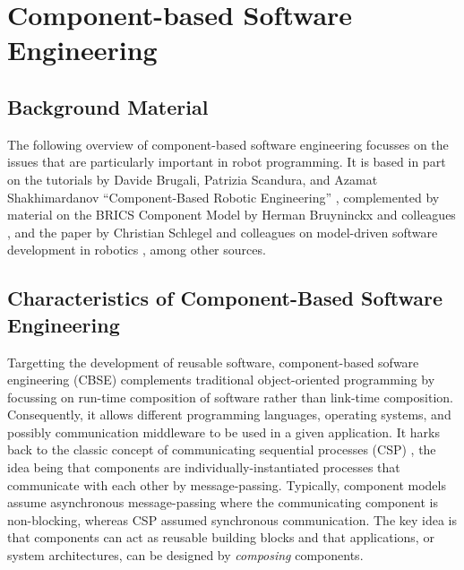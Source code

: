 \documentclass{CSSRforAfrica}
\begin{document}
\section{Component-based Software Engineering}
\label{section:componentSE}

\subsection{Background Material}

The following overview of component-based software engineering focusses on the issues that are particularly important in robot programming. It is based in part on the tutorials by Davide Brugali, Patrizia Scandura, and Azamat Shakhimardanov ``Component-Based Robotic Engineering'' \cite{BrugaliScandurra09,BrugaliShakhamirdanov10}, complemented by material on the BRICS Component Model by Herman Bruyninckx and colleagues \cite{Bruyninckxetal13}, and the paper by Christian Schlegel and colleagues on model-driven software development in robotics \cite{SchlegelSteckLotz2011}, among other sources.


\subsection{Characteristics of Component-Based Software Engineering}

Targetting the development of reusable software, component-based sofware engineering (CBSE)  complements traditional object-oriented programming by focussing on run-time composition of software rather than link-time composition.  Consequently, it allows different programming languages, operating systems, and possibly communication middleware to be used in a given application.  It harks back to the classic concept of communicating sequential processes (CSP) \cite{Hoare78}, the idea being that components are individually-instantiated processes that communicate  with each other by message-passing. Typically,  component models assume asynchronous message-passing where the communicating component is non-blocking, whereas CSP assumed synchronous communication.   The key idea is that components can act as reusable building blocks and that applications, or system architectures, can be designed by {\em composing} components.   
\end{document}
